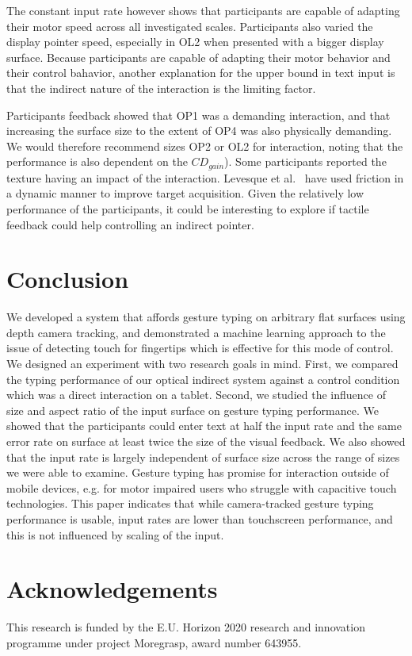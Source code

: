 \documentclass{chi-ext}
\newcommand{\cdt}[1]{{\small\uppercase{{#1}}}}
\begin{document}
The constant input rate however shows that participants are capable of adapting their motor speed across all investigated scales. Participants also varied the display pointer speed, especially in \cdt{OL2} when presented with a bigger display surface. Because participants are capable of adapting their motor behavior and their control bahavior, another explanation for the upper bound in text input is that the indirect nature of the interaction is the limiting factor.

Participants feedback showed that \cdt{OP1} was a demanding interaction, and that increasing the surface size to the extent of \cdt{OP4} was also physically demanding. We would therefore recommend sizes \cdt{OP2} or \cdt{OL2} for interaction, noting that the performance is also dependent on the $CD_{gain}$). Some participants reported the texture having an impact of the interaction. Levesque et al.~\cite{Levesque2011} have used friction in a dynamic manner to improve target acquisition. Given the relatively low performance of the participants, it could be interesting to explore if tactile feedback could help controlling an indirect pointer.

\section{Conclusion}
We developed a system that affords gesture typing on arbitrary flat surfaces using depth camera tracking, and demonstrated a machine learning approach to the issue of detecting touch for fingertips which is effective for this mode of control. We designed an experiment with two research goals in mind. First, we compared the typing performance of our optical indirect system against a control condition which was a direct interaction on a tablet. Second, we studied the influence of size and aspect ratio of the input surface on gesture typing performance. We showed that the participants could enter text at half the input rate and the same error rate on surface at least twice the size of the visual feedback. We also showed that the input rate is largely independent of surface size across the range of sizes we were able to examine. Gesture typing has promise for interaction outside of mobile devices, e.g. for motor impaired users who struggle with capacitive touch technologies. This paper indicates that while camera-tracked gesture typing performance is usable, input rates are lower than touchscreen performance, and this is not influenced by scaling of the input.

\section{Acknowledgements}
This research is funded by the E.U. Horizon 2020 research and innovation programme under project Moregrasp, award number 643955.

\newpage

\balance


\end{document}
